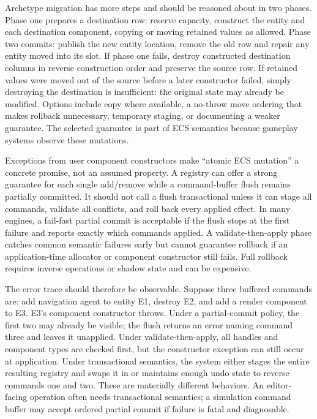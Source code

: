Archetype migration has more steps and should be reasoned about in two phases. Phase one prepares a destination row: reserve capacity, construct the entity and each destination component, copying or moving retained values as allowed. Phase two commits: publish the new entity location, remove the old row and repair any entity moved into its slot. If phase one fails, destroy constructed destination columns in reverse construction order and preserve the source row. If retained values were moved out of the source before a later constructor failed, simply destroying the destination is insufficient: the original state may already be modified. Options include copy where available, a no-throw move ordering that makes rollback unnecessary, temporary staging, or documenting a weaker guarantee. The selected guarantee is part of ECS semantics because gameplay systems observe these mutations.

Exceptions from user component constructors make ``atomic ECS mutation'' a concrete promise, not an assumed property. A registry can offer a strong guarantee for each single add/remove while a command-buffer flush remains partially committed. It should not call a flush transactional unless it can stage all commands, validate all conflicts, and roll back every applied effect. In many engines, a fail-fast partial commit is acceptable if the flush stops at the first failure and reports exactly which commands applied. A validate-then-apply phase catches common semantic failures early but cannot guarantee rollback if an application-time allocator or component constructor still fails. Full rollback requires inverse operations or shadow state and can be expensive.

The error trace should therefore be observable. Suppose three buffered commands are: add navigation agent to entity E1, destroy E2, and add a render component to E3. E3's component constructor throws. Under a partial-commit policy, the first two may already be visible; the flush returns an error naming command three and leaves it unapplied. Under validate-then-apply, all handles and component types are checked first, but the constructor exception can still occur at application. Under transactional semantics, the system either stages the entire resulting registry and swaps it in or maintains enough undo state to reverse commands one and two. These are materially different behaviors. An editor-facing operation often needs transactional semantics; a simulation command buffer may accept ordered partial commit if failure is fatal and diagnosable.

